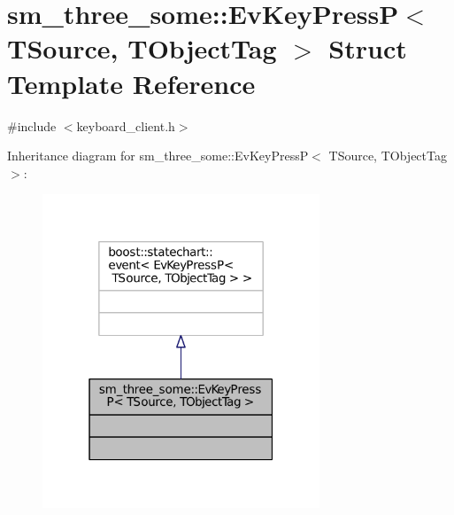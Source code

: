 \hypertarget{structsm__three__some_1_1EvKeyPressP}{}\section{sm\+\_\+three\+\_\+some\+:\+:Ev\+Key\+PressP$<$ T\+Source, T\+Object\+Tag $>$ Struct Template Reference}
\label{structsm__three__some_1_1EvKeyPressP}


{\ttfamily \#include $<$keyboard\+\_\+client.\+h$>$}



Inheritance diagram for sm\+\_\+three\+\_\+some\+:\+:Ev\+Key\+PressP$<$ T\+Source, T\+Object\+Tag $>$\+:
\nopagebreak
\begin{figure}[H]
\begin{center}
\leavevmode
\includegraphics[width=235pt]{structsm__three__some_1_1EvKeyPressP__inherit__graph}
\end{center}
\end{figure}


